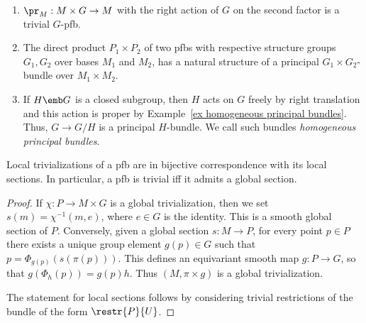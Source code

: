 \begin{example}
    \begin{enumerate}
        \item $\pr_M:M\times G\to M$ with the right action of $G$ on the second factor is a trivial $G$-\gls{pfb}.
        \item The direct product $P_1\times P_2$ of two \glspl{pfb} with respective structure groups $G_1,G_2$ over bases $M_1$ and $M_2$, has a natural structure of a principal $G_1\times G_2$-bundle over $M_1\times M_2$.
        \item If $H\emb G$ is a closed subgroup, then $H$ acts on $G$ freely by right translation and this action is proper by Example~\ref{ex homogeneous principal bundles}. Thus, $G\to G\slash H$ is a principal $H$-bundle. We call such bundles \emph{homogeneous principal bundles}.
    \end{enumerate}
\end{example}

\begin{prop}[{{\cite[Prop.~1.1.6]{RS2}}}]\label{prop 1.1.6 RS2}
    Local trivializations of a \gls{pfb} are in bijective correspondence with its local sections. In particular, a \gls{pfb} is trivial iff it admits a global section.
\end{prop}
\begin{proof}
    If $\chi:P\to M\times G$ is a global trivialization, then we set $s(m)=\chi^{-1}(m,e)$, where $e\in G$ is the identity. This is a smooth global section of $P$. Conversely, given a global section $s:M\to P$, for every point $p\in P$ there exists a unique group element $g(p)\in G$ such that $p=\Phi_{g(p)}(s(\pi(p)))$. This defines an equivariant smooth map $g:P\to G$, so that $g(\Phi_h(p))=g(p)h$. Thus $(M,\pi\times g)$ is a global trivialization.

    The statement for local sections follows by considering trivial restrictions of the bundle of the form $\restr{P}{U}$.
\end{proof}


